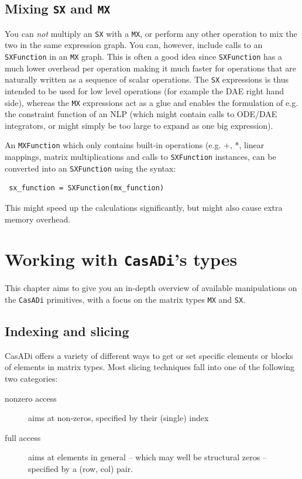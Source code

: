 \documentclass[a4paper,12pt]{book}
\newcommand{\CasADi}{\texttt{CasADi}\xspace}
\begin{document}
\section{Mixing \texttt{SX} and \texttt{MX}}
You can \emph{not} multiply an \texttt{SX} with a \texttt{MX}, or perform any other operation to mix the two in the same expression graph. You can, however, include calls to an \texttt{SXFunction} in an \texttt{MX} graph. This is often a good idea since \texttt{SXFunction} has a much lower overhead per operation making it much faster for operations that are naturally written as a sequence of scalar operations. The \texttt{SX} expressions is thus intended to be used for low level operations (for example the DAE right hand side), whereas the \texttt{MX} expressions act as a glue and enables the formulation of e.g. the constraint function of an NLP (which might contain calls to ODE/DAE integrators, or might simply be too large to expand as one big expression).

An \texttt{MXFunction} which only contains built-in operations (e.g. +, *, linear mappings, matrix multiplications and calls to \texttt{SXFunction} instances, can be converted into an \texttt{SXFunction} using the syntax:
\begin{verbatim}
 sx_function = SXFunction(mx_function)
\end{verbatim}

This might speed up the calculations significantly, but might also cause extra memory overhead.

\chapter{Working with \CasADi's types}

This chapter aims to give you an in-depth overview of available manipulations on the \CasADi primitives, with a focus on the matrix types \texttt{MX} and \texttt{SX}.

\section{Indexing and slicing}
CasADi offers a variety of different ways to get or set specific elements or blocks of elements in matrix types. Most slicing techniques fall into one of the following two categories:

\begin{description}
\item[nonzero access] aims at non-zeros, specified by their (single) index 
\item[full access] aims at elements in general -- which may well be structural zeros --  specified by a (row, col) pair.
\end{description}
\end{document}
